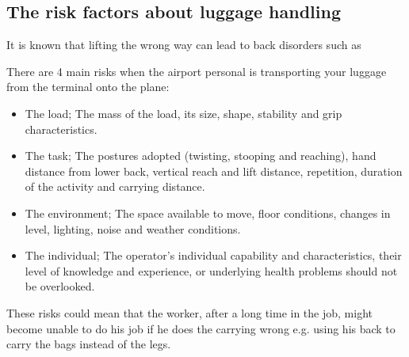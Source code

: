 \subsection{The risk factors about luggage handling}

It is known that lifting the wrong way can lead to back disorders such as 

There are 4 main risks when the airport personal is transporting your luggage from the terminal onto the plane:

\begin{itemize}
\item The load; The mass of the load, its size, shape, stability and grip characteristics.
\item The task; The postures adopted (twisting, stooping and reaching), hand distance from lower back, vertical reach and lift distance, repetition, duration of the activity and carrying distance.
\item The environment; The space available to move, floor conditions, changes in level, lighting, noise and weather conditions.
\item The individual; The operator's individual capability and characteristics, their level of knowledge and experience, or underlying health problems should not be overlooked.
\end{itemize}

These risks could mean that the worker, after a long time in the job, might become unable to do his job if he does the carrying wrong e.g. using his back to carry the bags instead of the legs.
